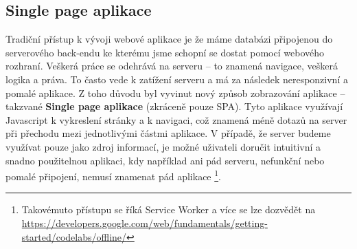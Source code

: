 \subsection{Single page aplikace}
\par Tradiční přístup k vývoji webové aplikace je že máme databázi připojenou do serverového back-endu ke kterému jsme schopní se dostat pomocí webového rozhraní. Veškerá práce se odehrává na serveru -- to znamená navigace, veškerá logika a práva. To často vede k zatížení serveru a má za následek neresponzivní a pomalé aplikace. Z toho důvodu byl vyvinut nový způsob zobrazování aplikace -- takzvané \textbf{Single page aplikace} (zkráceně pouze SPA). Tyto aplikace využívají Javascript k vykreslení stránky a k navigaci, což znamená méně dotazů na server při přechodu mezi jednotlivými částmi aplikace. V případě, že server budeme využívat pouze jako zdroj informací, je možné uživateli doručit intuitivní a snadno použitelnou aplikaci, kdy například ani pád serveru, nefunkční nebo pomalé připojení, nemusí znamenat pád aplikace \footnote{Takovémuto přístupu se říká Service Worker a více se lze dozvědět na \url{https://developers.google.com/web/fundamentals/getting-started/codelabs/offline/}}. \cite{serverless-singlepage-apps}

